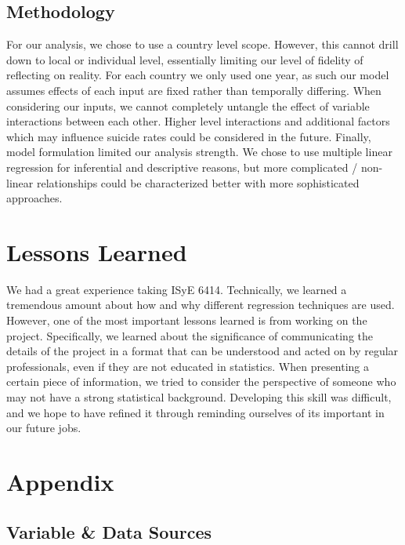 \documentclass[]{article}
\begin{document}
\subsection{Methodology}\label{methodology}

For our analysis, we chose to use a country level scope. However, this
cannot drill down to local or individual level, essentially limiting our
level of fidelity of reflecting on reality. For each country we only
used one year, as such our model assumes effects of each input are fixed
rather than temporally differing. When considering our inputs, we cannot
completely untangle the effect of variable interactions between each
other. Higher level interactions and additional factors which may
influence suicide rates could be considered in the future. Finally,
model formulation limited our analysis strength. We chose to use
multiple linear regression for inferential and descriptive reasons, but
more complicated / non-linear relationships could be characterized
better with more sophisticated approaches.

\section{Lessons Learned}\label{lessons-learned}

We had a great experience taking ISyE 6414. Technically, we learned a
tremendous amount about how and why different regression techniques are
used. However, one of the most important lessons learned is from working
on the project. Specifically, we learned about the significance of
communicating the details of the project in a format that can be
understood and acted on by regular professionals, even if they are not
educated in statistics. When presenting a certain piece of information,
we tried to consider the perspective of someone who may not have a
strong statistical background. Developing this skill was difficult, and
we hope to have refined it through reminding ourselves of its important
in our future jobs.

\newpage 

\section{Appendix}\label{appendix}

\subsection{Variable \& Data Sources}\label{variable-data-sources}
\end{document}
